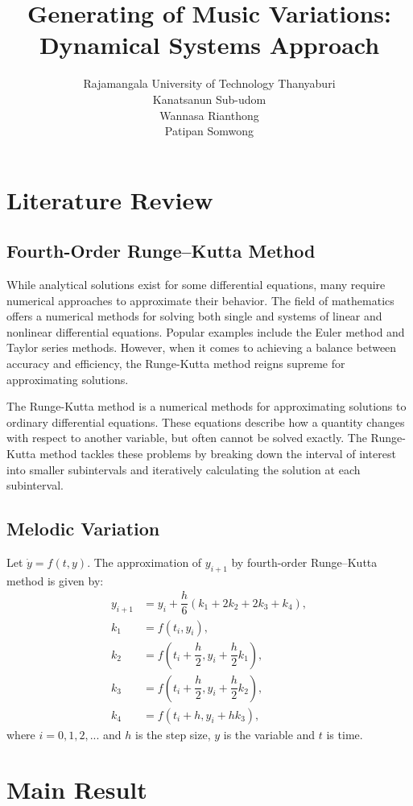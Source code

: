 \documentclass[11pt]{article}
\title{Generating of Music Variations: Dynamical Systems Approach}
\author{Rajamangala University of Technology Thanyaburi\\Kanatsanun Sub-udom\\Wannasa Rianthong\\Patipan Somwong}
\begin{document}
\section{Literature Review}

\subsection{Fourth-Order Runge–Kutta Method}
While analytical solutions exist for some differential equations, many require numerical approaches to approximate their behavior. The field of mathematics offers a numerical methods for solving both single and systems of linear and nonlinear differential equations. Popular examples include the Euler method and Taylor series methods. However, when it comes to achieving a balance between accuracy and efficiency, the Runge-Kutta method reigns supreme for approximating solutions.

The Runge-Kutta method \cite{bose_numerical_2019} is a numerical methods for approximating solutions to ordinary differential equations. These equations describe how a quantity changes with respect to another variable, but often cannot be solved exactly. The Runge-Kutta method tackles these problems by breaking down the interval of interest into smaller subintervals and iteratively calculating the solution at each subinterval. 

\subsection{Melodic Variation}

Let $\dot{y} = f(t,y)$. The approximation of $y_{i+1}$ by fourth-order Runge–Kutta method is given by:
\begin{align*}
y_{i+1} &= y_i + \dfrac{h}{6}(k_1 + 2k_2 + 2k_3 + k_4), \\
k_1 &= f(t_i, y_i), \\
k_2 &= f\left( t_i + \dfrac{h}{2}, y_i + \dfrac{h}{2}k_1 \right), \\
k_3 &= f\left( t_i + \dfrac{h}{2}, y_i + \dfrac{h}{2}k_2 \right), \\
k_4 &= f(t_i + h, y_i + hk_3),
\end{align*}
\label{fig:RK4}
where $i = 0,1,2,...$ and $h$ is the step size, $y$ is the variable and $t$ is time. \\
\section{Main Result}
\end{document}
